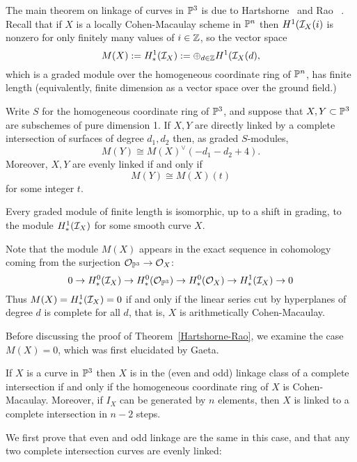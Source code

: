 The main theorem on linkage of curves in ${\mathbb P}^3$ is due to Hartshorne~\cite{} and Rao ~\cite{}. Recall  that if $X$ is a locally Cohen-Macaulay scheme in ${\mathbb P}^n$ then $H^1({\mathcal I}_X(i)$ is nonzero for only finitely many values of $i\in {\mathbb Z}$, so
the vector space
$$
M(X) := H^1_*({\mathcal I}_X) := \oplus_{d\in {\mathbb Z}}H^1({\mathcal I}_X(d),
$$
which is a graded module over the homogeneous coordinate ring of ${\mathbb P}^n$, has finite length (equivalently, finite dimension as a 
vector space over the ground field.)

\begin{theorem}\label{Hartshorne-Rao}
Write $S$ for the homogeneous coordinate ring
of ${\mathbb P}^3$, and suppose that $X,Y\subset {\mathbb P}^3$ are subschemes of pure dimension 1. If $X,Y$ are directly linked by a complete
intersection of surfaces of degree $d_1,d_2$ then, as graded $S$-modules,
$$
M(Y)\cong M(X)^\vee(-d_1-d_2+4).
$$
Moreover, $X,Y$ are evenly linked if and only if 
$$
M(Y) \cong M(X)(t)
$$
 for some integer $t$. 
 
 Every graded module of finite length is isomorphic, up to a shift in grading,
to the module $H^1_*({\mathcal I}_X)$ for some smooth curve $X$.
\end{theorem}
Note that the module $M(X)$ appears in the exact sequence in cohomology coming from the surjection ${\mathcal O}_{{\mathbb P}^3} \to {\mathcal O}_X$:
$$
0\to H^0_*({\mathcal I}_X) \to H^0_*({\mathcal O}_{{\mathbb P}^3}) \to H^0_*({\mathcal O}_X) \to H^1_*({\mathcal I}_X) \to 0
$$
Thus $M(X) = H^1_*({\mathcal I}_X) = 0$ if and only if the linear series cut by hyperplanes of degree $d$ is complete for all $d$, that is,
$X$ is arithmetically Cohen-Macaulay.

Before discussing the proof of Theorem~\ref{Hartshorne-Rao}, we examine the case $M(X) = 0$, which was first elucidated by Gaeta. 

\begin{theorem}\label{Gaeta}
If $X$ is a curve in ${\mathbb P}^3$  then $X$ is in the (even and odd) linkage class of a complete intersection if and only if the homogeneous
coordinate ring of $X$ is Cohen-Macaulay. Moreover, if $I_X$ can be generated by $n$ elements, then $X$ is linked to
a complete intersection in $n-2$ steps.
\end{theorem}

We first prove that even and odd linkage are the same in this case, and that any two complete intersection curves
are evenly linked:


